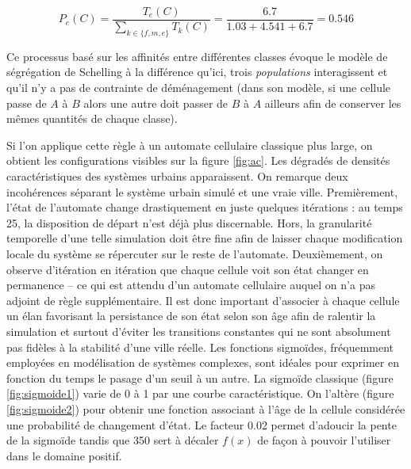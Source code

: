 \documentclass[10pt]{article}
\begin{document}
\begin{equation*}
P_e(C) = \frac{T_e(C)}{\sum_{k \in \{f,m,e\}} T_k(C)} = \frac{6.7}{1.03 + 4.541 + 6.7} = 0.546
\end{equation*}

Ce processus basé sur les affinités entre différentes classes évoque
le modèle de ségrégation de Schelling à la différence qu'ici, trois
\textit{populations} interagissent et qu'il n'y a pas de contrainte de
déménagement (dans son modèle, si une cellule passe de $A$ à $B$ alors
une autre doit passer de $B$ à $A$ ailleurs afin de conserver les
mêmes quantités de chaque classe).

Si l'on applique cette règle à un automate cellulaire classique plus
large, on obtient les configurations visibles sur la figure
\ref{fig:ac}. Les dégradés de densités caractéristiques des systèmes
urbains apparaissent. On remarque deux incohérences séparant le
système urbain simulé et une vraie ville. Premièrement, l'état de
l'automate change drastiquement en juste quelques itérations : au
temps 25, la disposition de départ n'est déjà plus discernable. Hors,
la granularité temporelle d'une telle simulation doit être fine afin
de laisser chaque modification locale du système se répercuter sur le
reste de l'automate. Deuxièmement, on observe d'itération en itération
que chaque cellule voit son état changer en permanence -- ce qui est
attendu d'un automate cellulaire auquel on n'a pas adjoint de règle
supplémentaire. Il est donc important d'associer à chaque cellule un
élan favorisant la persistance de son état selon son âge afin de
ralentir la simulation et surtout d'éviter les transitions constantes
qui ne sont absolument pas fidèles à la stabilité d'une ville
réelle. Les fonctions sigmoïdes, fréquemment employées en modélisation
de systèmes complexes, sont idéales pour exprimer en fonction du temps
le pasage d'un seuil à un autre. La sigmoïde classique (figure
\ref{fig:sigmoide1}) varie de 0 à 1 par une courbe caractéristique. On
l'altère (figure \ref{fig:sigmoide2}) pour obtenir une fonction
associant à l'âge de la cellule considérée une probabilité de
changement d'état. Le facteur 0.02 permet d'adoucir la pente de la
sigmoïde tandis que 350 sert à décaler $f(x)$ de façon à pouvoir
l'utiliser dans le domaine positif.
\end{document}
